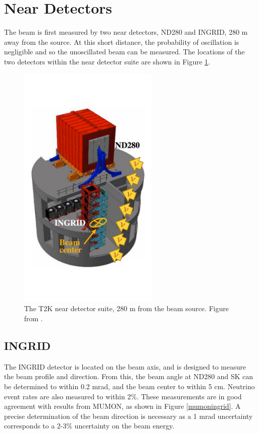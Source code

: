 \section{Near Detectors}\label{sec:nd}

The beam is first measured by two near detectors, ND280 and INGRID, 280 m away from the source. At this short distance, the probability of oscillation is negligible and so the unoscillated beam can be measured. The locations of the two detectors within the near detector suite are shown in Figure \ref{ndpit}.

\begin{figure}
\centering
\includegraphics*[width=0.6\textwidth,trim={0 10cm 0 10cm},clip]{figs/ndpitcenter}
\caption{The T2K near detector suite, 280 m from the beam source. Figure from \cite{t2kproposal}.} \label{ndpit}
\end{figure}

\subsection{INGRID}\label{sec:ingrid}

The INGRID detector is located on the beam axis, and is designed to measure the beam profile and direction. From this, the beam angle at ND280 and SK can be determined to within 0.2 mrad, and the beam center to within 5 cm. Neutrino event rates are also measured to within 2$\%$. These measurements are in good agreement with results from MUMON, as shown in Figure \ref{mumoningrid}. A precise determination of the beam direction is necessary as a 1 mrad uncertainty corresponds to a 2-3$\%$ uncertainty on the beam energy.

